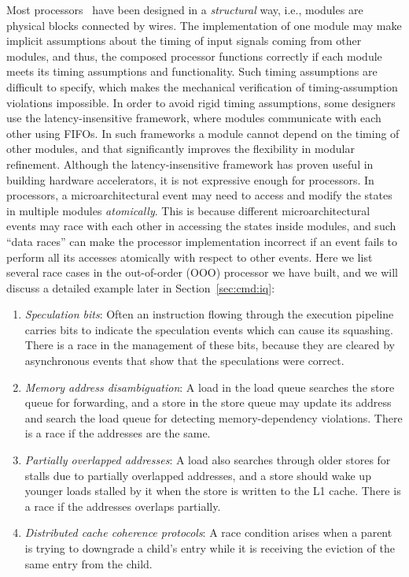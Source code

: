 \documentclass[conference]{IEEEtran}
\begin{document}
Most processors~\cite{rocketchip,boom,fabscalar,pulp} have been designed in a \emph{structural} way, i.e., modules are physical blocks connected by wires.
The implementation of one module may make implicit assumptions about the timing of input signals coming from other modules, and thus, the composed processor functions correctly if each module meets its timing assumptions and functionality.
Such timing assumptions are difficult to specify, which makes the mechanical verification of timing-assumption violations impossible.
In order to avoid rigid timing assumptions, some designers use the latency-insensitive framework, where modules communicate with each other using FIFOs.
In such frameworks a module cannot depend on the timing of other modules, and that significantly improves the flexibility in modular refinement.
Although the latency-insensitive framework has proven useful in building hardware accelerators, it is not expressive enough for processors. 
In processors, a microarchitectural event may need to access and modify the states in multiple modules \emph{atomically}. 
This is because different microarchitectural events may race with each other in accessing the states inside modules, and such ``data races'' can make the processor implementation incorrect if an event fails to perform all its accesses atomically with respect to other events.
Here we list several race cases in the out-of-order (OOO) processor we have built, and we will discuss a detailed example later in Section~\ref{sec:cmd:iq}:
\begin{enumerate}
    \item \emph{Speculation bits}:
    Often an instruction flowing through the execution pipeline carries bits to indicate the speculation events which can cause its squashing.
    There is a race in the management of these bits, because they are cleared by asynchronous events that show that the speculations were correct.
    
    \item \emph{Memory address disambiguation}:
    A load in the load queue searches the store queue for forwarding, and a store in the store queue may update its address and search the load queue for detecting memory-dependency violations. 
    There is a race if the addresses are the same.
    
    \item \emph{Partially overlapped addresses}:
    A load also searches through older stores for stalls due to partially overlapped addresses, and a store should wake up younger loads stalled by it when the store is written to the L1 cache.
    There is a race if the addresses overlaps partially.
    
    \item \emph{Distributed cache coherence protocols}:
    A race condition arises when a parent is trying to downgrade a child's entry while it is receiving the eviction of the same entry from the child.
\end{enumerate}
\end{document}

